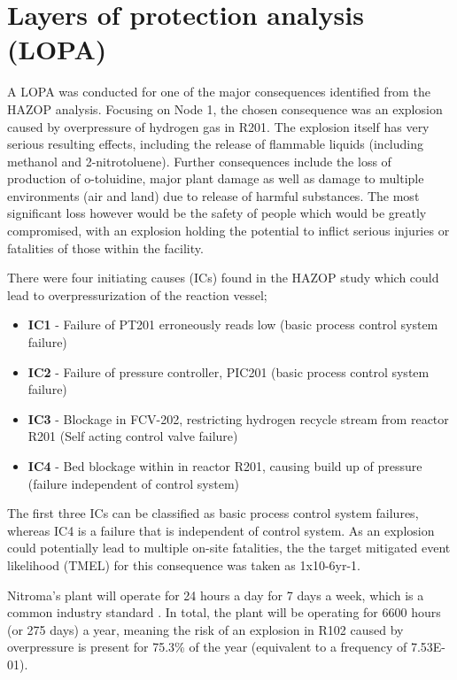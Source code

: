 \section{Layers of protection analysis (LOPA)}

A LOPA was conducted for one of the major consequences identified from the HAZOP analysis. Focusing on Node 1, the chosen consequence was an explosion caused by overpressure of hydrogen gas in R201. The explosion itself has very serious resulting effects, including the release of flammable liquids (including methanol and 2-nitrotoluene). Further consequences include the loss of production of o-toluidine, major plant damage as well as damage to multiple environments (air and land) due to release of harmful substances. The most significant loss however would be the safety of people which would be greatly compromised, with an explosion holding the potential to inflict serious injuries or fatalities of those within the facility. 

There were four initiating causes (ICs) found in the HAZOP study which could lead to overpressurization of the reaction vessel;

\begin{itemize}
\item \textbf{IC1} - Failure of PT201 erroneously reads low  (basic process control system failure)
\item \textbf{IC2} - Failure of pressure controller, PIC201 (basic process control system failure)
\item \textbf{IC3 }- Blockage in FCV-202, restricting hydrogen recycle stream from reactor R201 (Self acting control valve failure)
\item \textbf{IC4} - Bed blockage within in reactor R201, causing build up of pressure (failure independent of control system)
\end{itemize}

The first three ICs can be classified as basic process control system failures, whereas IC4 is a failure that is independent of control system. As an explosion could potentially lead to multiple on-site fatalities, the the target mitigated event likelihood (TMEL) for this consequence was taken as 1x10-6yr-1. 


Nitroma's plant will operate for 24 hours a day for 7 days a week, which is a common industry standard \cite{job_guide_chemical_2021}. In total, the plant will be operating for 6600 hours (or 275 days) a year, meaning the risk of an explosion in R102 caused by overpressure is present for 75.3\% of the year (equivalent to a frequency of 7.53E-01).  
 
